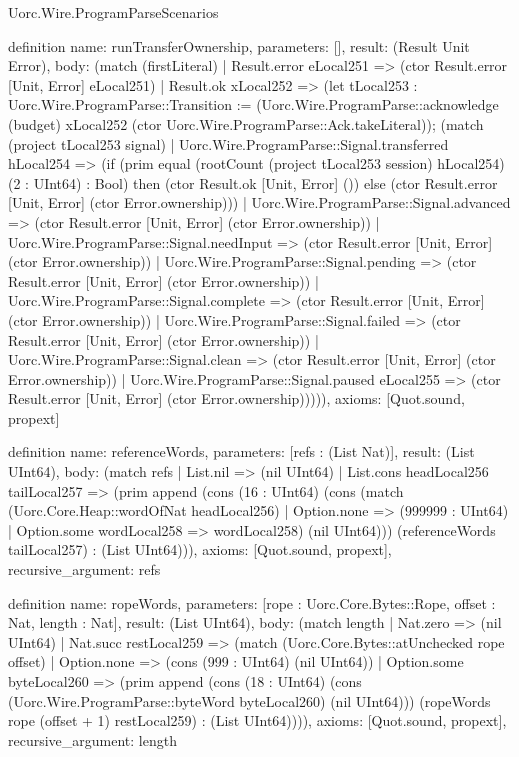 \begin{lexlean}{Uorc.Wire.ProgramParseScenarios}
\begin{semanticmodule}
definition{
  name: runTransferOwnership,
  parameters: [],
  result: (Result Unit Error),
  body: (match (firstLiteral)
    | Result.error eLocal251 => (ctor Result.error [Unit, Error] eLocal251)
    | Result.ok xLocal252 => (let tLocal253 : Uorc.Wire.ProgramParse::Transition := (Uorc.Wire.ProgramParse::acknowledge (budget) xLocal252 (ctor Uorc.Wire.ProgramParse::Ack.takeLiteral)); (match (project tLocal253 signal)
      | Uorc.Wire.ProgramParse::Signal.transferred hLocal254 => (if (prim equal (rootCount (project tLocal253 session) hLocal254) (2 : UInt64) : Bool) then (ctor Result.ok [Unit, Error] ()) else (ctor Result.error [Unit, Error] (ctor Error.ownership)))
      | Uorc.Wire.ProgramParse::Signal.advanced => (ctor Result.error [Unit, Error] (ctor Error.ownership))
      | Uorc.Wire.ProgramParse::Signal.needInput => (ctor Result.error [Unit, Error] (ctor Error.ownership))
      | Uorc.Wire.ProgramParse::Signal.pending => (ctor Result.error [Unit, Error] (ctor Error.ownership))
      | Uorc.Wire.ProgramParse::Signal.complete => (ctor Result.error [Unit, Error] (ctor Error.ownership))
      | Uorc.Wire.ProgramParse::Signal.failed => (ctor Result.error [Unit, Error] (ctor Error.ownership))
      | Uorc.Wire.ProgramParse::Signal.clean => (ctor Result.error [Unit, Error] (ctor Error.ownership))
      | Uorc.Wire.ProgramParse::Signal.paused eLocal255 => (ctor Result.error [Unit, Error] (ctor Error.ownership))))),
  axioms: [Quot.sound, propext]
}

definition{
  name: referenceWords,
  parameters: [refs : (List Nat)],
  result: (List UInt64),
  body: (match refs
    | List.nil => (nil UInt64)
    | List.cons headLocal256 tailLocal257 => (prim append (cons (16 : UInt64) (cons (match (Uorc.Core.Heap::wordOfNat headLocal256)
      | Option.none => (999999 : UInt64)
      | Option.some wordLocal258 => wordLocal258) (nil UInt64))) (referenceWords tailLocal257) : (List UInt64))),
  axioms: [Quot.sound, propext],
  recursive_argument: refs
}

definition{
  name: ropeWords,
  parameters: [rope : Uorc.Core.Bytes::Rope, offset : Nat, length : Nat],
  result: (List UInt64),
  body: (match length
    | Nat.zero => (nil UInt64)
    | Nat.succ restLocal259 => (match (Uorc.Core.Bytes::atUnchecked rope offset)
      | Option.none => (cons (999 : UInt64) (nil UInt64))
      | Option.some byteLocal260 => (prim append (cons (18 : UInt64) (cons (Uorc.Wire.ProgramParse::byteWord byteLocal260) (nil UInt64))) (ropeWords rope (offset + 1) restLocal259) : (List UInt64)))),
  axioms: [Quot.sound, propext],
  recursive_argument: length
}


\end{semanticmodule}
\end{lexlean}

